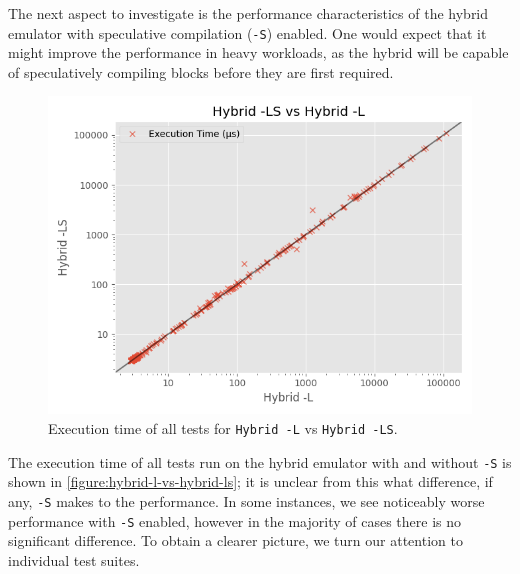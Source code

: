 
The next aspect to investigate is the performance characteristics of the hybrid emulator with speculative compilation (\texttt{-S}) enabled. One would expect that it might improve the performance in heavy workloads, as the hybrid will be capable of speculatively compiling blocks before they are first required. 

\begin{figure}[H]
    \centering
    \includegraphics[scale=0.75]{output/graphs/scatter/vs/Hybrid -L-vs-Hybrid -LS-time.png}
    \caption{Execution time of all tests for \texttt{Hybrid -L} vs \texttt{Hybrid -LS}.}
    \label{figure:hybrid-l-vs-hybrid-ls}
\end{figure}

The execution time of all tests run on the hybrid emulator with and without \texttt{-S} is shown in \autoref{figure:hybrid-l-vs-hybrid-ls}; it is unclear from this what difference, if any, \texttt{-S} makes to the performance. In some instances, we see noticeably worse performance with \texttt{-S} enabled, however in the majority of cases there is no significant difference. To obtain a clearer picture, we turn our attention to individual test suites.

